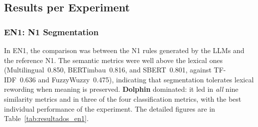 \documentclass[a4paper,fleqn]{cas-sc}
\begin{document}
\subsection{Results per Experiment}

\subsubsection{EN1: N1 Segmentation}

In EN1, the comparison was between the N1 rules generated by the LLMs and the reference N1. The semantic metrics were well above the lexical ones (Multilingual~0.850, BERTimbau~0.816, and SBERT~0.801, against TF-IDF~0.636 and FuzzyWuzzy~0.475), indicating that segmentation tolerates lexical rewording when meaning is preserved. \textbf{Dolphin} dominated: it led in \textit{all} nine similarity metrics and in three of the four classification metrics, with the best individual performance of the experiment. The detailed figures are in Table~\ref{tab:resultados_en1}.
\end{document}
